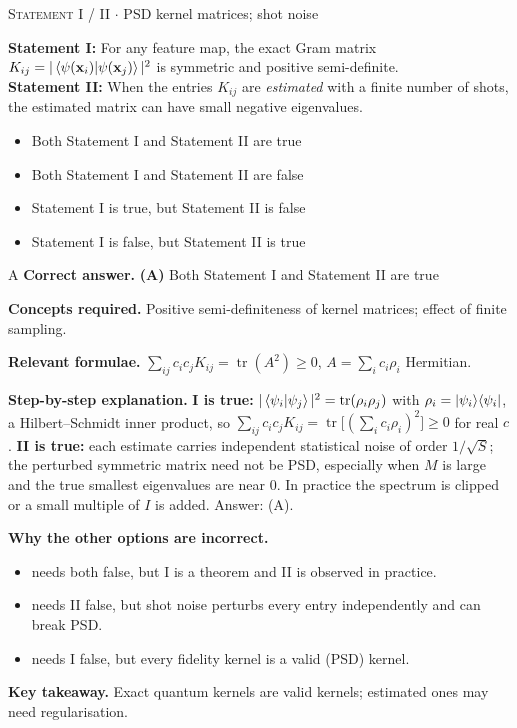 \documentclass[11pt,a4paper]{article}
\newcommand{\optlabel}[1]{\textbf{(#1)}}
\newcommand{\correctlabel}[1]{\textcolor{okgreen}{\textbf{(#1)}\,\ding{51}}}
\newenvironment{qitem}[1]{\begin{list}{}{\setlength{\leftmargin}{3.3em}\setlength{\labelwidth}{3.1em}%
  \setlength{\labelsep}{0.2em}\setlength{\topsep}{3pt}\setlength{\parsep}{3pt}}\item[\textbf{Q.#1}\hfill]}{\end{list}}
\newcommand{\qsep}{\par\vspace{2pt}{\color{black!15}\hrule}\vspace{4pt}}
\newcommand{\qmeta}[2]{{\footnotesize\color{black!60}\textsc{#1} \;$\cdot$\; #2}\par}
\begin{document}
\begin{qitem}{58}
\qmeta{Statement I / II}{PSD kernel matrices; shot noise}
\textbf{Statement I:} For any feature map, the exact Gram matrix $K_{ij} = |\braket{\psi(\mathbf x_i)|\psi(\mathbf x_j)}|^2$ is
symmetric and positive semi-definite.\\[1mm]
\textbf{Statement II:} When the entries $K_{ij}$ are \emph{estimated} with a finite number of shots, the estimated matrix can have small
negative eigenvalues.
\begin{itemize}[leftmargin=2.6em, labelsep=0.4em, itemsep=2pt, topsep=3pt]
\item[\correctlabel{A}] Both Statement I and Statement II are true
\item[\optlabel{B}] Both Statement I and Statement II are false
\item[\optlabel{C}] Statement I is true, but Statement II is false
\item[\optlabel{D}] Statement I is false, but Statement II is true
\end{itemize}
\end{qitem}
\begin{solbox}{A}
\textbf{\color{brand}Correct answer.} \textcolor{okgreen}{\textbf{(A)}} Both Statement I and Statement II are true

\textbf{\color{brand}Concepts required.} Positive semi-definiteness of kernel matrices; effect of finite sampling.

\textbf{\color{brand}Relevant formulae.} $\sum_{ij}c_ic_jK_{ij} = \operatorname{tr}(A^2) \ge 0$, $A = \sum_ic_i\rho_i$ Hermitian.

\textbf{\color{brand}Step-by-step explanation.} \textbf{I is true:} $|\braket{\psi_i|\psi_j}|^2 = \operatorname{tr}(\rho_i\rho_j)$ with $\rho_i = \ket{\psi_i}\!\bra{\psi_i}$, a Hilbert--Schmidt inner product, so
$\sum_{ij}c_ic_jK_{ij} = \operatorname{tr}\big[(\sum_ic_i\rho_i)^2\big] \ge 0$ for real $c$. \textbf{II is true:} each estimate carries independent
statistical noise of order $1/\sqrt S$; the perturbed symmetric matrix need not be PSD, especially when $M$ is large and the
true smallest eigenvalues are near 0. In practice the spectrum is clipped or a small multiple of $I$ is added. Answer: (A).

\textbf{\color{brand}Why the other options are incorrect.}
\begin{itemize}[leftmargin=2.4em, itemsep=1pt, topsep=2pt]
\item[\textbf{(B)}] needs both false, but I is a theorem and II is observed in practice.
\item[\textbf{(C)}] needs II false, but shot noise perturbs every entry independently and can break PSD.
\item[\textbf{(D)}] needs I false, but every fidelity kernel is a valid (PSD) kernel.
\end{itemize}
\textbf{\color{brand}Key takeaway.} Exact quantum kernels are valid kernels; estimated ones may need regularisation.
\end{solbox}
\qsep
\end{document}
